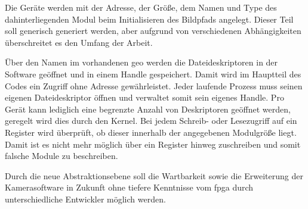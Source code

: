 Die Geräte werden mit der Adresse, der Größe, dem Namen und Type des dahinterliegenden Modul beim Initialisieren des Bildpfads angelegt. Dieser Teil soll generisch generiert werden, aber aufgrund von verschiedenen Abhängigkeiten überschreitet es den Umfang der Arbeit.


Über den Namen im vorhandenen \ac{geo} werden die Dateideskriptoren in der Software geöffnet und in einem Handle gespeichert. Damit wird im Hauptteil des Codes ein Zugriff ohne Adresse gewährleistet. Jeder laufende Prozess muss seinen eigenen Dateideskriptor öffnen und verwaltet somit sein eigenes Handle. Pro Gerät kann lediglich eine begrenzte Anzahl von Deskriptoren geöffnet werden, geregelt wird dies durch den Kernel. 
Bei jedem Schreib- oder Lesezugriff auf ein Register wird überprüft, ob dieser innerhalb der angegebenen Modulgröße liegt. Damit ist es nicht mehr möglich über ein Register hinweg zuschreiben und somit falsche Module zu beschreiben.


Durch die neue Abstraktionsebene soll die Wartbarkeit sowie die Erweiterung der Kamerasoftware in Zukunft ohne tiefere Kenntnisse vom \ac{fpga} durch unterschiedliche Entwickler möglich werden.









